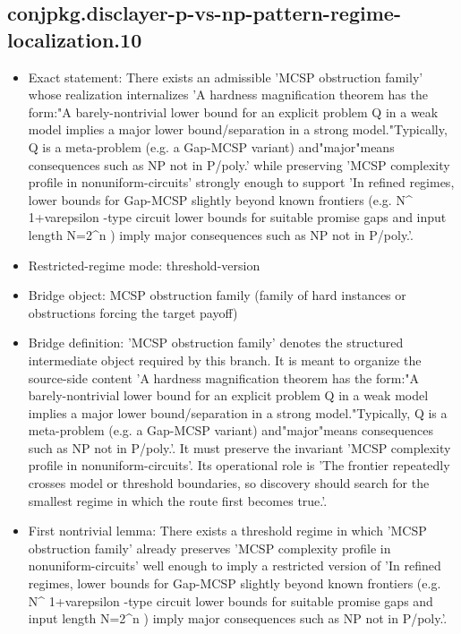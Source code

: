 \documentclass[11pt]{article}
\begin{document}
\subsection*{conjpkg.disclayer-p-vs-np-pattern-regime-localization.10}
\begin{itemize}
\item Exact statement: There exists an admissible 'MCSP obstruction family' whose realization internalizes 'A hardness magnification theorem has the form:"A barely-nontrivial lower bound for an explicit problem Q in a weak model implies a major lower bound/separation in a strong model."Typically, Q is a meta-problem (e.g. a Gap-MCSP variant) and"major"means consequences such as NP not in P/poly.' while preserving 'MCSP complexity profile in nonuniform-circuits' strongly enough to support 'In refined regimes, lower bounds for Gap-MCSP slightly beyond known frontiers (e.g. N\textasciicircum{} 1+varepsilon -type circuit lower bounds for suitable promise gaps and input length N=2\textasciicircum{}n ) imply major consequences such as NP not in P/poly.'.
\item Restricted-regime mode: threshold-version
\item Bridge object: MCSP obstruction family (family of hard instances or obstructions forcing the target payoff)
\item Bridge definition: 'MCSP obstruction family' denotes the structured intermediate object required by this branch. It is meant to organize the source-side content 'A hardness magnification theorem has the form:"A barely-nontrivial lower bound for an explicit problem Q in a weak model implies a major lower bound/separation in a strong model."Typically, Q is a meta-problem (e.g. a Gap-MCSP variant) and"major"means consequences such as NP not in P/poly.'. It must preserve the invariant 'MCSP complexity profile in nonuniform-circuits'. Its operational role is 'The frontier repeatedly crosses model or threshold boundaries, so discovery should search for the smallest regime in which the route first becomes true.'.
\item First nontrivial lemma: There exists a threshold regime in which 'MCSP obstruction family' already preserves 'MCSP complexity profile in nonuniform-circuits' well enough to imply a restricted version of 'In refined regimes, lower bounds for Gap-MCSP slightly beyond known frontiers (e.g. N\textasciicircum{} 1+varepsilon -type circuit lower bounds for suitable promise gaps and input length N=2\textasciicircum{}n ) imply major consequences such as NP not in P/poly.'.

\end{itemize}
\end{document}
